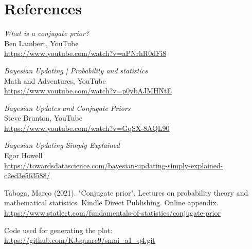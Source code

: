 \documentclass[11pt]{article}
\begin{document}
\section{References}

\begin{enumerate}[leftmargin=*, label={[\arabic*]}]

  \item \textit{What is a conjugate prior?}\\
  Ben Lambert, YouTube \\
  \url{https://www.youtube.com/watch?v=aPNrhR0dFi8}

  \item \textit{
Bayesian Updating | Probability and statistics}\\
  Math and Adventures, YouTube\\
  \url{https://www.youtube.com/watch?v=p0ybAJMHNtE}

  \item \textit{
Bayesian Updates and Conjugate Priors}\\
  Steve Brunton, YouTube\\
  \url{https://www.youtube.com/watch?v=GqSX-8AQL90}

  \item \textit{
Bayesian Updating Simply Explained}\\
  Egor Howell\\
  \url{https://towardsdatascience.com/bayesian-updating-simply-explained-c2ed3e563588/}

  \item Taboga, Marco (2021). "Conjugate prior", Lectures on probability theory and mathematical statistics. Kindle Direct Publishing. Online appendix.\\
  \url{https://www.statlect.com/fundamentals-of-statistics/conjugate-prior}

  \item Code used for generating the plot:\\
  \url{https://github.com/KJsquare9/smai_a1_q4.git}

\end{enumerate}
\end{document}
